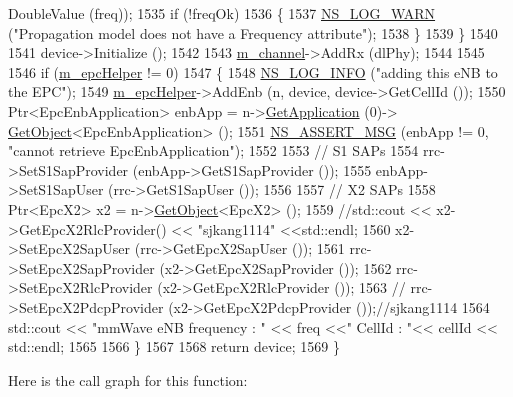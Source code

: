 \begin{DoxyCode}
      DoubleValue (freq));
1535                 \textcolor{keywordflow}{if} (!freqOk)
1536                 \{
1537                         \hyperlink{group__logging_gade7208b4009cdf0e25783cd26766f559}{NS\_LOG\_WARN} (\textcolor{stringliteral}{"Propagation model does not have a Frequency attribute"});
1538                 \}
1539         \}
1540 
1541         device->Initialize ();
1542 
1543         \hyperlink{classns3_1_1MmWaveHelper_adac6d83bc2acef8b7dbd9fc668207d95}{m\_channel}->AddRx (dlPhy);
1544 
1545 
1546         \textcolor{keywordflow}{if} (\hyperlink{classns3_1_1MmWaveHelper_a03b33f9a2480a4cdd8ffe697ccc08e9e}{m\_epcHelper} != 0)
1547         \{
1548                 \hyperlink{group__logging_gafbd73ee2cf9f26b319f49086d8e860fb}{NS\_LOG\_INFO} (\textcolor{stringliteral}{"adding this eNB to the EPC"});
1549                 \hyperlink{classns3_1_1MmWaveHelper_a03b33f9a2480a4cdd8ffe697ccc08e9e}{m\_epcHelper}->AddEnb (n, device, device->GetCellId ());
1550                 Ptr<EpcEnbApplication> enbApp = n->\hyperlink{classns3_1_1Node_ad0ab54d76712398c0a8e25d9ac59ea41}{GetApplication} (0)->
      \hyperlink{classns3_1_1Object_a13e18c00017096c8381eb651d5bd0783}{GetObject}<EpcEnbApplication> ();
1551                 \hyperlink{assert_8h_aff5ece9066c74e681e74999856f08539}{NS\_ASSERT\_MSG} (enbApp != 0, \textcolor{stringliteral}{"cannot retrieve EpcEnbApplication"});
1552 
1553                 \textcolor{comment}{// S1 SAPs}
1554                 rrc->SetS1SapProvider (enbApp->GetS1SapProvider ());
1555                 enbApp->SetS1SapUser (rrc->GetS1SapUser ());
1556 
1557                 \textcolor{comment}{// X2 SAPs}
1558                 Ptr<EpcX2> x2 = n->\hyperlink{classns3_1_1Object_a13e18c00017096c8381eb651d5bd0783}{GetObject}<EpcX2> ();
1559                 \textcolor{comment}{//std::cout << x2->GetEpcX2RlcProvider() << "sjkang1114" <<std::endl;}
1560                 x2->SetEpcX2SapUser (rrc->GetEpcX2SapUser ());
1561                 rrc->SetEpcX2SapProvider (x2->GetEpcX2SapProvider ());
1562                 rrc->SetEpcX2RlcProvider (x2->GetEpcX2RlcProvider ());
1563          \textcolor{comment}{//      rrc->SetEpcX2PdcpProvider (x2->GetEpcX2PdcpProvider ());//sjkang1114}
1564                 std::cout << \textcolor{stringliteral}{"mmWave eNB frequency : "} << freq <<\textcolor{stringliteral}{" CellId : "}<< cellId << std::endl;
1565 
1566         \}
1567 
1568         \textcolor{keywordflow}{return} device;
1569 \}
\end{DoxyCode}


Here is the call graph for this function\+:




